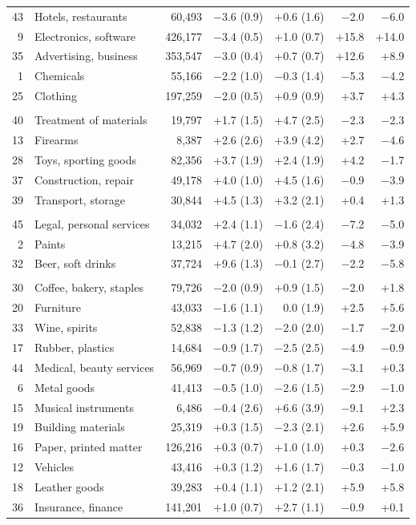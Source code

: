 {\begin{longtable}{r>{\raggedright\arraybackslash}p{3.7cm}rrrrr}
43 & Hotels, restaurants & 60,493 & $-$3.6 (0.9) & +0.6 (1.6) & $-$2.0 & $-$6.0 \\
9 & Electronics, software & 426,177 & $-$3.4 (0.5) & +1.0 (0.7) & +15.8 & +14.0 \\
35 & Advertising, business & 353,547 & $-$3.0 (0.4) & +0.7 (0.7) & +12.6 & +8.9 \\
1 & Chemicals & 55,166 & $-$2.2 (1.0) & $-$0.3 (1.4) & $-$5.3 & $-$4.2 \\
25 & Clothing & 197,259 & $-$2.0 (0.5) & +0.9 (0.9) & +3.7 & +4.3 \\
\addlinespace\multicolumn{7}{l}{\emph{Lead: benefit persists}} \\
40 & Treatment of materials & 19,797 & +1.7 (1.5) & +4.7 (2.5) & $-$2.3 & $-$2.3 \\
13 & Firearms & 8,387 & +2.6 (2.6) & +3.9 (4.2) & +2.7 & $-$4.6 \\
28 & Toys, sporting goods & 82,356 & +3.7 (1.9) & +2.4 (1.9) & +4.2 & $-$1.7 \\
37 & Construction, repair & 49,178 & +4.0 (1.0) & +4.5 (1.6) & $-$0.9 & $-$3.9 \\
39 & Transport, storage & 30,844 & +4.5 (1.3) & +3.2 (2.1) & +0.4 & +1.3 \\
\addlinespace\multicolumn{7}{l}{\emph{Lead: benefit fades}} \\
45 & Legal, personal services & 34,032 & +2.4 (1.1) & $-$1.6 (2.4) & $-$7.2 & $-$5.0 \\
2 & Paints & 13,215 & +4.7 (2.0) & +0.8 (3.2) & $-$4.8 & $-$3.9 \\
32 & Beer, soft drinks & 37,724 & +9.6 (1.3) & $-$0.1 (2.7) & $-$2.2 & $-$5.8 \\
\addlinespace\multicolumn{7}{l}{\emph{Lead: small}} \\
30 & Coffee, bakery, staples & 79,726 & $-$2.0 (0.9) & +0.9 (1.5) & $-$2.0 & +1.8 \\
20 & Furniture & 43,033 & $-$1.6 (1.1) & 0.0 (1.9) & +2.5 & +5.6 \\
33 & Wine, spirits & 52,838 & $-$1.3 (1.2) & $-$2.0 (2.0) & $-$1.7 & $-$2.0 \\
17 & Rubber, plastics & 14,684 & $-$0.9 (1.7) & $-$2.5 (2.5) & $-$4.9 & $-$0.9 \\
44 & Medical, beauty services & 56,969 & $-$0.7 (0.9) & $-$0.8 (1.7) & $-$3.1 & +0.3 \\
6 & Metal goods & 41,413 & $-$0.5 (1.0) & $-$2.6 (1.5) & $-$2.9 & $-$1.0 \\
15 & Musical instruments & 6,486 & $-$0.4 (2.6) & +6.6 (3.9) & $-$9.1 & +2.3 \\
19 & Building materials & 25,319 & +0.3 (1.5) & $-$2.3 (2.1) & +2.6 & +5.9 \\
16 & Paper, printed matter & 126,216 & +0.3 (0.7) & +1.0 (1.0) & +0.3 & $-$2.6 \\
12 & Vehicles & 43,416 & +0.3 (1.2) & +1.6 (1.7) & $-$0.3 & $-$1.0 \\
18 & Leather goods & 39,283 & +0.4 (1.1) & +1.2 (2.1) & +5.9 & +5.8 \\
36 & Insurance, finance & 141,201 & +1.0 (0.7) & +2.7 (1.1) & $-$0.9 & +0.1 \\
\bottomrule\end{longtable}}
